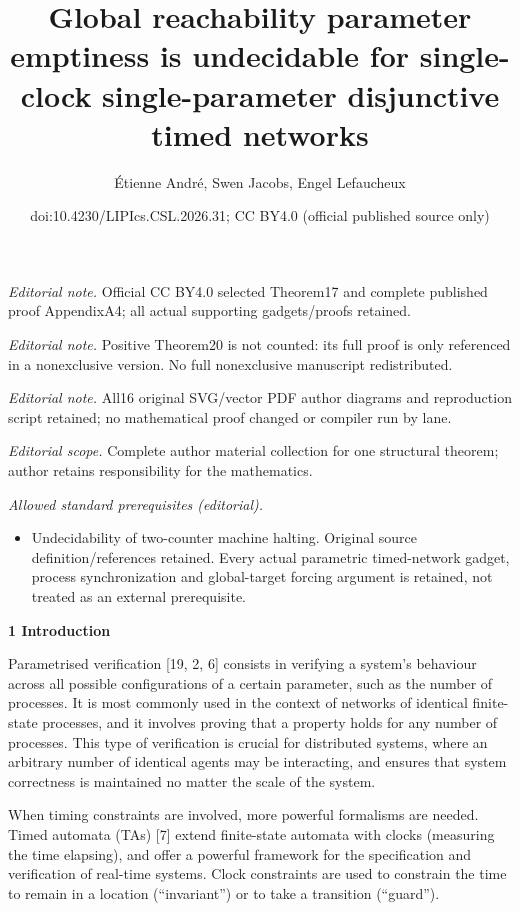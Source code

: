 \documentclass[10pt,a4paper]{article}
\title{Global reachability parameter emptiness is undecidable for single-clock single-parameter disjunctive timed networks}
\author{Étienne André, Swen Jacobs, Engel Lefaucheux}
\date{doi:10.4230/LIPIcs.CSL.2026.31; CC BY4.0 (official published source only)}
\begin{document}
\maketitle
\noindent\textit{Editorial note.} Official CC BY4.0 selected Theorem17 and complete published proof AppendixA4; all actual supporting gadgets/proofs retained.\par\medskip
\noindent\textit{Editorial note.} Positive Theorem20 is not counted: its full proof is only referenced in a nonexclusive version. No full nonexclusive manuscript redistributed.\par\medskip
\noindent\textit{Editorial note.} All16 original SVG/vector PDF author diagrams and reproduction script retained; no mathematical proof changed or compiler run by lane.\par\medskip
\noindent\textit{Editorial scope.} Complete author material collection for one structural theorem; author retains responsibility for the mathematics.\par\medskip
\noindent\textit{Allowed standard prerequisites (editorial).}\begin{itemize}
\item Undecidability of two-counter machine halting. Original source definition/references retained. Every actual parametric timed-network gadget, process synchronization and global-target forcing argument is retained, not treated as an external prerequisite.
\end{itemize}\medskip

 
\par\medskip\noindent\textbf{1 Introduction}\par
 
 
Parametrised verification [19, 2, 6] consists in verifying a system’s behaviour across all possible configurations of a certain parameter, such as the number of processes. It is most commonly used in the context of networks of identical finite-state processes, and it involves proving that a property holds for any number of processes. This type of verification is crucial for distributed systems, where an arbitrary number of identical agents may be interacting, and ensures that system correctness is maintained no matter the scale of the system.\par
 
 
 
When timing constraints are involved, more powerful formalisms are needed. Timed automata (TAs) [7] extend finite-state automata with clocks (measuring the time elapsing), and offer a powerful framework for the specification and verification of real-time systems. Clock constraints are used to constrain the time to remain in a location (“invariant”) or to take a transition (“guard”).\par
 
\end{document}

